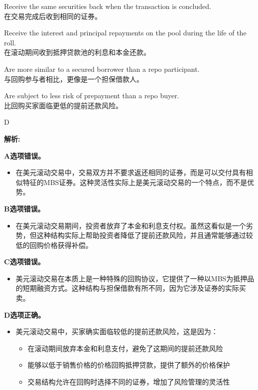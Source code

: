 \documentclass{article}
\newenvironment{explanation}
{\textbf{解析:}\par}
{\par}
\begin{document}
\begin{choices}
    \item Receive the same securities back when the transaction is concluded.\\
    在交易完成后收到相同的证券。
    \item Receive the interest and principal repayments on the pool during the life of the roll.\\
    在滚动期间收到抵押贷款池的利息和本金还款。
    \item Are more similar to a secured borrower than a repo participant.\\
    与回购参与者相比，更像是一个担保借款人。
    \item Are subject to less risk of prepayment than a repo buyer.\\
    比回购买家面临更低的提前还款风险。
\end{choices}

\begin{correctanswer}
    D
\end{correctanswer}

\begin{explanation}
    \textbf{A选项错误。}
    \begin{itemize}
        \item 在美元滚动交易中，交易双方并不要求返还相同的证券，而是可以交付具有相似特征的MBS证券。这种灵活性实际上是美元滚动交易的一个特点，而不是优势。
    \end{itemize}

    \textbf{B选项错误。}
    \begin{itemize}
        \item 在美元滚动交易期间，投资者放弃了本金和利息支付权。虽然这看似是一个劣势，但这种结构实际上帮助投资者降低了提前还款风险，并且通常能够通过较低的回购价格获得补偿。
    \end{itemize}

    \textbf{C选项错误。}
    \begin{itemize}
        \item 美元滚动交易在本质上是一种特殊的回购协议，它提供了一种以MBS为抵押品的短期融资方式。这种结构与担保借款有所不同，因为它涉及证券的实际买卖。
    \end{itemize}

    \textbf{D选项正确。}
    \begin{itemize}
        \item 美元滚动交易中，买家确实面临较低的提前还款风险，这是因为：
        \begin{itemize}
            \item 在滚动期间放弃本金和利息支付，避免了这期间的提前还款风险
            \item 能够以低于销售价格的价格回购抵押贷款，提供了额外的价格保护
            \item 交易结构允许在回购时选择不同的证券，增加了风险管理的灵活性
        \end{itemize}
    \end{itemize}
\end{explanation}
\end{document}
